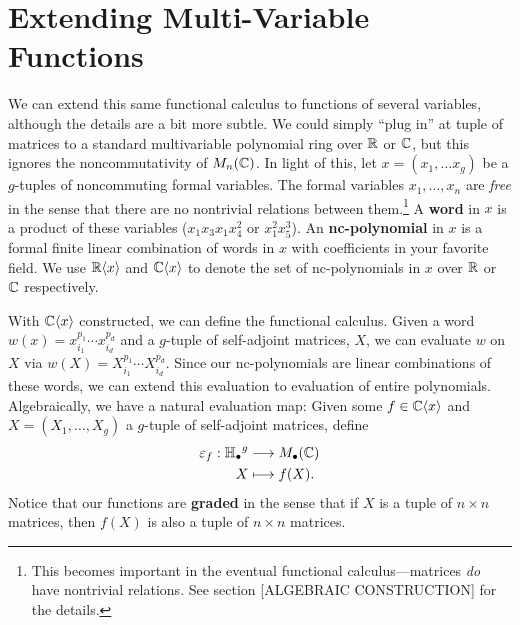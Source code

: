 \section{Extending Multi-Variable Functions}%
\label{sec:ExtMuliVarFun}

We can extend this same functional calculus to functions of several variables,
although the details are a bit more subtle. We could simply ``plug in'' at tuple
of matrices to a standard multivariable polynomial ring over \(\mathbb{R} \) or
\(\mathbb{C} \), but this ignores the noncommutativity of \(M_n(\mathbb{C})\). In light of this,
let \(x = (x_1 , \dots x_g)\) be a
\(g\)-tuples of noncommuting formal variables. The formal variables
\(x_1, \dots , x_n\) are \emph{free} in the sense that there are no nontrivial
relations between them.\footnote{This becomes important in the eventual
  functional calculus---matrices \emph{do} have nontrivial relations. See
  section [ALGEBRAIC CONSTRUCTION] for the details.}
A \textbf{word} in \(x\) is a product of these
variables (\eg \(x_1x_3x_1x_4^2\) or \(x_1^2x_5^3\)). An \textbf{nc-polynomial}
in \(x\) is a formal finite linear combination of words in \(x\) with
coefficients in your favorite field. We use \(\mathbb{R} \langle x \rangle\) and
\(\mathbb{C} \langle x \rangle\) to denote the set of nc-polynomials in \(x\) over
\(\mathbb{R} \) or \(\mathbb{C} \) respectively.

With \(\mathbb{C} \langle x \rangle \) constructed, we can define the functional
calculus. Given a word \(w(x) = x_{i_1}^{p_1}\cdots x_{i_d}^{p_d}\) and a
\(g\)-tuple of self-adjoint matrices, \(X\), we can evaluate \(w\) on \(X\) via
\(w(X) = X_{i_1}^{p_1}\cdots X_{i_d}^{p_d}\). Since our nc-polynomials are
linear combinations of these words, we can extend this evaluation to evaluation
of entire polynomials. Algebraically, we have a natural evaluation map:
Given some \(f \in \mathbb{C} \langle x \rangle \) and
\(X = \left( X_1, \dots ,X_g \right) \) a
\(g\)-tuple of self-adjoint matrices, define
\begin{align*}
  \varepsilon_f: {\mathbb{H}_\bullet}^g &\longrightarrow M_\bullet(\mathbb{C}) \\
             X &\longmapsto f(X)
.\end{align*}
Notice that our functions are \textbf{graded} in the sense that if \(X\) is a
tuple of \(n \times n\) matrices, then \(f(X)\) is also a tuple of
\(n \times n\) matrices.

